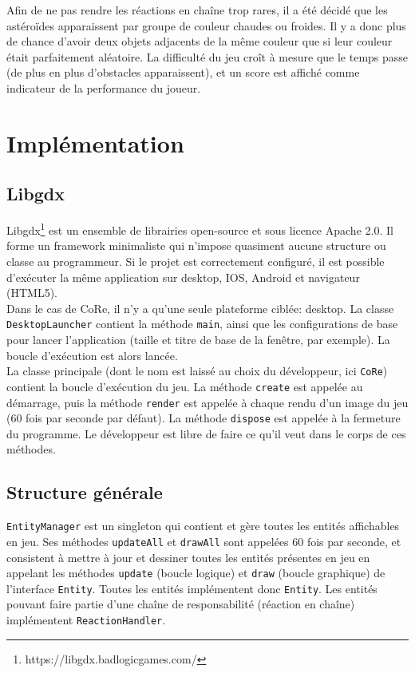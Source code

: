 \documentclass[11pt,a4paper,twoside,svgnames]{article}
\begin{document}
Afin de ne pas rendre les réactions en chaîne trop rares, il a été décidé que les astéroïdes apparaissent par groupe de couleur chaudes ou froides. Il y a donc plus de chance d'avoir deux objets adjacents de la même couleur que si leur couleur était parfaitement aléatoire. La difficulté du jeu croît à mesure que le temps passe (de plus en plus d'obstacles apparaissent), et un score est affiché comme indicateur de la performance du joueur.

\clearpage

\section{Implémentation}
\subsection{Libgdx}
Libgdx\footnote{https://libgdx.badlogicgames.com/} est un ensemble de librairies open-source et sous licence Apache 2.0. Il forme un framework minimaliste qui n'impose quasiment aucune structure ou classe au programmeur. Si le projet est correctement configuré, il est possible d'exécuter la même application sur desktop, IOS, Android et navigateur (HTML5).\\

Dans le cas de CoRe, il n'y a qu'une seule plateforme ciblée: desktop. La classe \texttt{DesktopLauncher} contient la méthode \texttt{main}, ainsi que les configurations de base pour lancer l'application (taille et titre de base de la fenêtre, par exemple). La boucle d'exécution est alors lancée.\\

La classe principale (dont le nom est laissé au choix du développeur, ici \texttt{CoRe}) contient la boucle d'exécution du jeu. La méthode \texttt{create} est appelée au démarrage, puis la méthode \texttt{render} est appelée à chaque rendu d'un image du jeu (60 fois par seconde par défaut). La méthode \texttt{dispose} est appelée à la fermeture du programme. Le développeur est libre de faire ce qu'il veut dans le corps de ces méthodes.

\subsection{Structure générale}
\texttt{EntityManager} est un singleton qui contient et gère toutes les entités affichables en jeu. Ses méthodes \texttt{updateAll} et \texttt{drawAll} sont appelées 60 fois par seconde, et consistent à mettre à jour et dessiner toutes les entités présentes en jeu en appelant les méthodes \texttt{update} (boucle logique) et \texttt{draw} (boucle graphique) de l'interface \texttt{Entity}. Toutes les entités implémentent donc \texttt{Entity}. Les entités pouvant faire partie d'une chaîne de responsabilité (réaction en chaîne) implémentent \texttt{ReactionHandler}.\\
\end{document}
